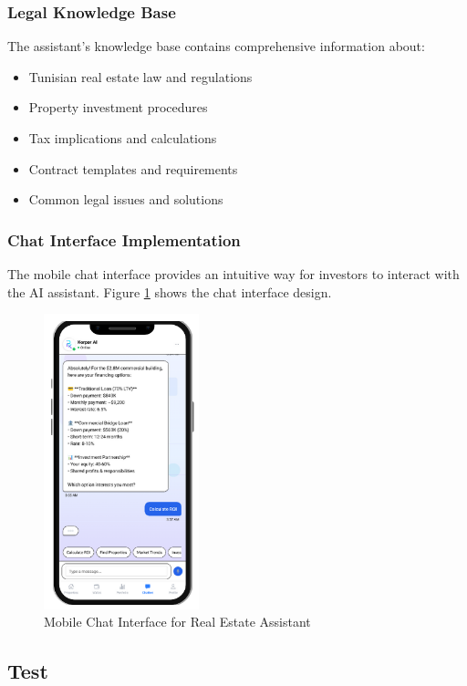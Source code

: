 \subsubsection{Legal Knowledge Base}
The assistant's knowledge base contains comprehensive information about:
\begin{itemize}
    \item Tunisian real estate law and regulations
    \item Property investment procedures
    \item Tax implications and calculations
    \item Contract templates and requirements
    \item Common legal issues and solutions
\end{itemize}

\subsubsection{Chat Interface Implementation}
The mobile chat interface provides an intuitive way for investors to interact with the AI assistant. Figure \ref{fig:assistant-mobile-chat} shows the chat interface design.
\begin{figure}[htbp]
    \centering
    \includegraphics[width=0.4\textwidth]{images/assistant_mobile_chat.png}
    \caption{Mobile Chat Interface for Real Estate Assistant}
    \label{fig:assistant-mobile-chat}
\end{figure}

\newpage

\subsection{Test}

